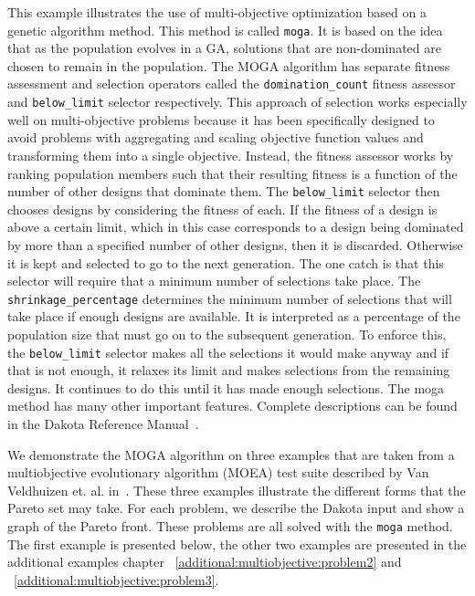 This example illustrates the use of multi-objective optimization based
on a genetic algorithm method. This method is called \texttt{moga}. It
is based on the idea that as the population evolves in a GA, solutions
that are non-dominated are chosen to remain in the population.  The
MOGA algorithm has separate fitness assessment and selection operators
called the \texttt{domination\_count} fitness assessor and
\texttt{below\_limit} selector respectively.  This approach of
selection works especially well on multi-objective problems because it
has been specifically designed to avoid problems with aggregating and
scaling objective function values and transforming them into a single
objective. Instead, the fitness assessor works by ranking population
members such that their resulting fitness is a function of the number
of other designs that dominate them. The \texttt{below\_limit}
selector then chooses designs by considering the fitness of each. If
the fitness of a design is above a certain limit, which in this case
corresponds to a design being dominated by more than a specified
number of other designs, then it is discarded. Otherwise it is kept
and selected to go to the next generation. The one catch is that this
selector will require that a minimum number of selections take
place. The \texttt{shrinkage\_percentage} determines the minimum
number of selections that will take place if enough designs are
available. It is interpreted as a percentage of the population size
that must go on to the subsequent generation. To enforce this, the
\texttt{below\_limit} selector makes all the selections it would make
anyway and if that is not enough, it relaxes its limit and makes
selections from the remaining designs. It continues to do this until
it has made enough selections.  The moga method has many other
important features. Complete descriptions can be found in the Dakota
Reference Manual~\cite{RefMan}.
 
We demonstrate the MOGA algorithm on three examples that are taken
from a multiobjective evolutionary algorithm (MOEA) test suite
described by Van Veldhuizen et. al. in~\cite{Coe02}. These three
examples illustrate the different forms that the Pareto set may
take. For each problem, we describe the Dakota input and show a graph
of the Pareto front. These problems are all solved with the
\texttt{moga} method.  The first example is presented below, the other
two examples are presented in the additional examples chapter
~\ref{additional:multiobjective:problem2} and
~\ref{additional:multiobjective:problem3}.

